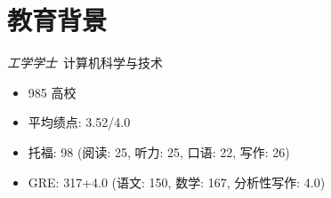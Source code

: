 \section{教育背景}
\textit{工学学士}\ 计算机科学与技术
\begin{itemize}
  \item 985 高校
  \item 平均绩点: 3.52/4.0
  \item 托福: 98 (阅读: 25, 听力: 25, 口语: 22, 写作: 26)
  \item GRE: 317+4.0 (语文: 150, 数学: 167, 分析性写作: 4.0)
\end{itemize}